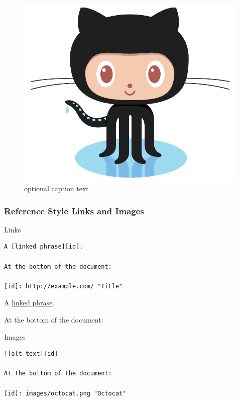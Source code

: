 \documentclass[]{book}
\begin{document}
\begin{figure}
\centering
\includegraphics{images/octocat.png}
\caption{optional caption text}
\end{figure}

\hypertarget{reference-style-links-and-images}{%
\subsubsection{Reference Style Links and Images}\label{reference-style-links-and-images}}

Links

\begin{verbatim}
A [linked phrase][id].

At the bottom of the document:

[id]: http://example.com/ "Title"
\end{verbatim}

A \href{images/octocat.png}{linked phrase}.

At the bottom of the document:

Images

\begin{verbatim}
![alt text][id]

At the bottom of the document:

[id]: images/octocat.png "Octocat"
\end{verbatim}
\end{document}
